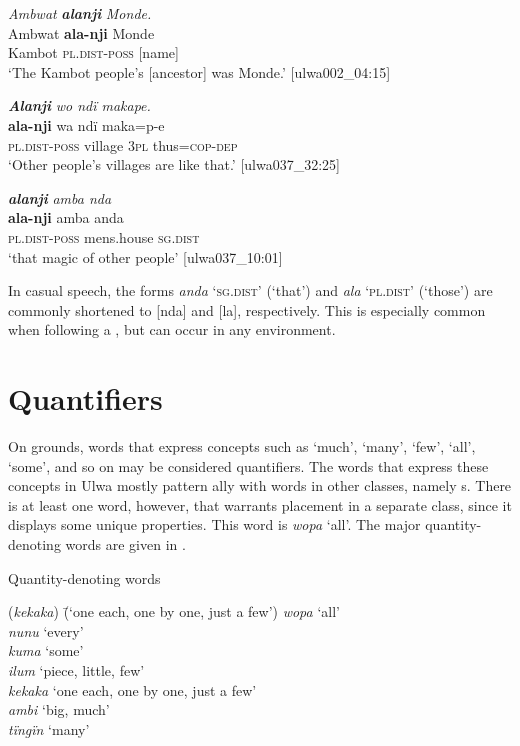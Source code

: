 \ea%
    \label{ex:det:159}
          \textit{Ambwat} \textbf{\textit{alanji}} \textit{Monde.}\\
\gll    Ambwat  \textbf{ala-nji}      Monde\\
    Kambot  \textsc{pl.dist-poss}  [name]\\
\glt `The Kambot people’s [ancestor] was Monde.’ [ulwa002\_04:15]
\z

\ea%
    \label{ex:det:160}
          \textbf{\textit{Alanji}} \textit{wo ndï makape.}\\
\gll    \textbf{ala-nji}      wa    ndï  maka=p-e\\
    \textsc{pl.dist-poss}  village  3\textsc{pl}  thus=\textsc{cop{}-dep}\\
\glt `Other people’s villages are like that.’ [ulwa037\_32:25]
\z

\ea%
    \label{ex:det:161}
          \textbf{\textit{alanji}} \textit{amba nda}\\
\gll    \textbf{ala-nji}      amba        anda\\
    \textsc{pl.dist-poss}  mens.house    \textsc{sg.dist}\\
\glt `that magic of other people’ [ulwa037\_10:01]
\z

In casual speech, the forms \textit{anda} ‘\textsc{sg.dist}’ (‘that’)  and \textit{ala} ‘\textsc{pl.dist}’ (‘those’) are commonly shortened to [nda] and [la], respectively. This is especially common when following a , but can occur in any environment.



\section{Quantifiers}\label{sec:7.4}


On  grounds, words that express concepts such as ‘much’, ‘many’, ‘few’, ‘all’, ‘some’, and so on may be considered quantifiers. The words that express these concepts in Ulwa mostly pattern ally with words in other classes, namely s. There is at least one word, however, that warrants placement in a separate  class, since it displays some unique  properties. This word is \textit{wopa} ‘all’. The major quantity-denoting words are given in .

\ea%
    \label{ex:det:202}
          Quantity-denoting words\\
\begin{tabbing}
{(\textit{kekaka})} \= {(‘one each, one by one, just a few’)}\kill
{\textit{wopa}} \> {‘all’}\\
{\textit{nunu}} \> {‘every’}\\
{\textit{kuma}} \> {‘some’}\\
{\textit{ilum}} \> {‘piece, little, few’}\\
{\textit{kekaka}} \> {‘one each, one by one, just a few’}\\
{\textit{ambi}} \> {‘big, much’}\\
{\textit{tïngïn}} \> {‘many}’
\end{tabbing}
 \z

